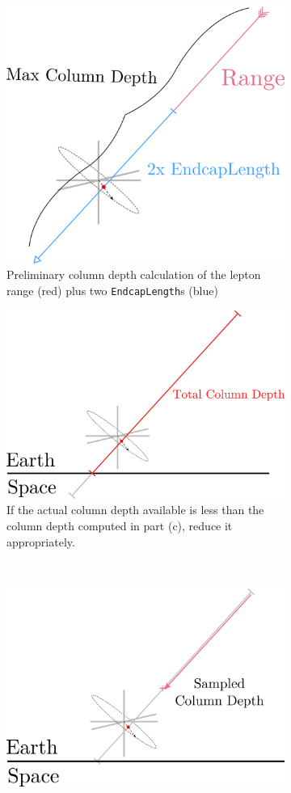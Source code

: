 \documentclass[main.tex]{subfiles}
\begin{document}
\begin{figure}
\begin{subfigure}[b]{0.5\linewidth}
        \includegraphics[width=0.8\linewidth]{figures/LI_direction_max_mwe.png}
        \caption{Preliminary column depth calculation of the lepton range (red) plus two \texttt{EndcapLength}s (blue)}
        \label{fig:lepton_ranged3}
    \end{subfigure}%
    \begin{subfigure}[b]{0.5\linewidth}
    	\centering
        \includegraphics[width=0.8\linewidth]{figures/LI_direction_cut.png}
        \caption{If the actual column depth available is less than the column depth computed in part (c), reduce it appropriately.}
        \label{fig:lepton_ranged4}
    \end{subfigure} \\
    \begin{subfigure}[b]{0.5\linewidth}
    	\centering
        \includegraphics[width=0.8\linewidth]{figures/LI_direction_sam_mwe.png}

\end{subfigure}
\end{figure}
\end{document}
